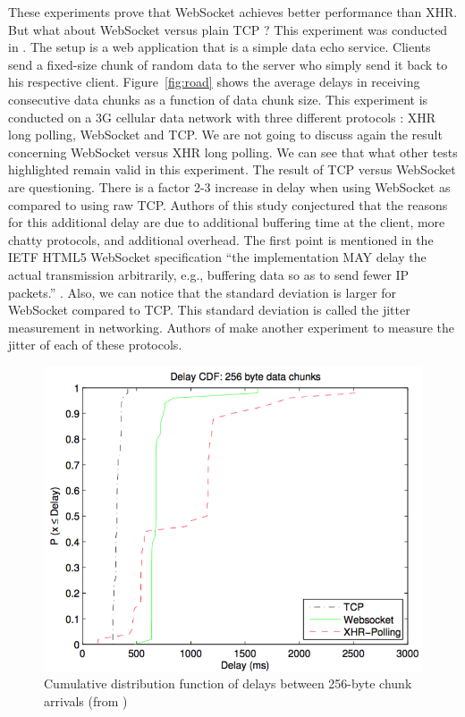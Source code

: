 \documentclass[10pt,journal,compsoc]{IEEEtran}
\newcommand{\ws}{WebSocket}
\begin{document}
These experiments prove that \ws{} achieves better performance than XHR. But what about \ws{} versus plain TCP ? 
This experiment was conducted in \cite{roadblock}.
The setup is a web application that is a simple data echo service.
Clients send a fixed-size chunk of random data to the server who simply send it back to his respective client.
Figure~\ref{fig:road} shows the average delays in receiving consecutive data chunks as a function of data chunk size. 
This experiment is conducted on a 3G cellular data network with three different protocols : XHR long polling, \ws{} and TCP.
We are not going to discuss again the result concerning \ws{} versus XHR long polling.
We can see that what other tests highlighted remain valid in this experiment.
The result of TCP versus \ws{} are questioning.
There is a factor 2-3 increase in delay when using \ws{} as compared to using raw TCP.
Authors of this study conjectured that the reasons for this additional delay are due to additional buffering time at the client, more chatty protocols, and additional overhead.
The first point is mentioned in the IETF HTML5 \ws{} specification ``the implementation MAY delay the actual transmission arbitrarily, e.g., buffering data so as to send fewer IP packets.'' \cite{rfc6455}.
Also, we can notice that the standard deviation is larger for \ws{} compared to TCP.
This standard deviation is called the jitter measurement in networking.
Authors of \cite{roadblock} make another experiment to measure the jitter of each of these protocols.
\begin{figure}[!ht]
    \centering
    \includegraphics[width=\linewidth]{road_jitter.png}
    \caption{Cumulative distribution function of delays between 256-byte chunk arrivals (from \cite{roadblock})}
    \label{fig:road2}
\end{figure}
\end{document}
